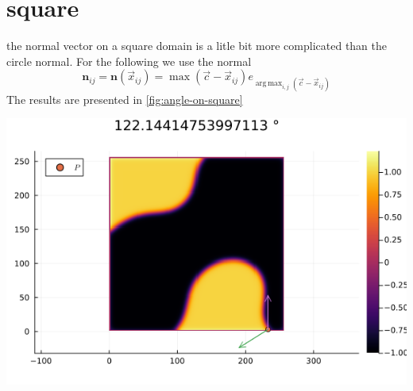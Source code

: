 \documentclass{mimosis}
\DeclareMathOperator*{\argmax}{arg\,\max}
\begin{document}
\section{square}
\label{sec:orgf2fd92c}
the normal vector on a square domain is a litle bit more complicated than the circle normal. For the following we use the normal
\begin{equation}
\label{eq:9}
\mathbf{n}_{ij} = \mathbf{n}(\vec{x}_{ij}) = \max(\vec{c} - \vec{x}_{ij}) e_{\argmax_{i,j}(\vec{c} - \vec{x}_{ij})}
\end{equation}
The results are presented in \ref{fig:angle-on-square}
\begin{center}
\includegraphics[width=.9\linewidth]{images/angle-square.png}
\label{fig:angle-on-square}
\end{center}
\end{document}

